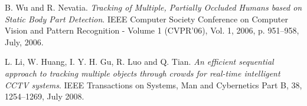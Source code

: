 \begin{thebibliography}{20}
B. Wu and R. Nevatia.
\textit{Tracking of Multiple, Partially Occluded Humans based on Static Body Part Detection}. 
IEEE Computer Society Conference on Computer Vision and Pattern Recognition - Volume 1 (CVPR'06), Vol. 1, 2006, p. 951–958, July, 2006.

L. Li, W. Huang, I. Y. H. Gu, R. Luo and Q. Tian.
\textit{An efficient sequential approach to tracking multiple objects through crowds for real-time intelligent CCTV systems}. 
IEEE Transactions on Systems, Man and Cybernetics Part B, 38, 1254–1269, July 2008.


 


\end{thebibliography}
